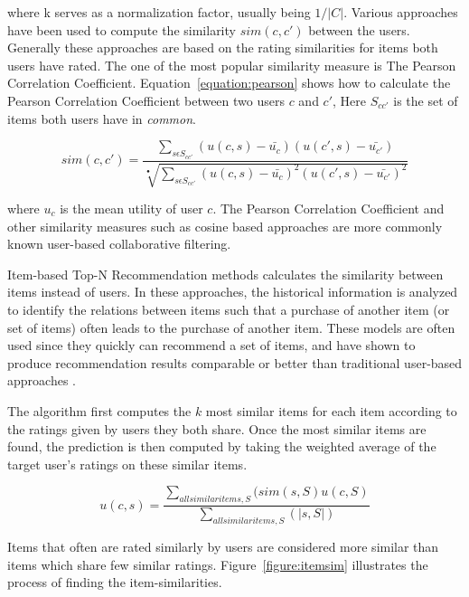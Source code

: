 where k serves as a normalization factor, usually being $1/|C|$. Various
approaches have been used to compute the similarity $sim(c, c')$ between the
users. Generally these approaches are based on the rating similarities for
items both users have rated. The one of the most popular similarity measure is The Pearson
Correlation Coefficient. Equation~\ref{equation:pearson} shows how to calculate
the Pearson Correlation Coefficient between two users $c$ and $c'$, Here
$S_{cc'}$ is the set of items both users have in \emph{common}.

\begin{equation}
sim(c, c') = \frac{\sum_{s \epsilon S_{cc'}} (u(c, s)-\bar{u_{c}})(u(c',s)-\bar{u_{c'}})}{\sqrt[•]{\sum_{s \epsilon S_{cc'}} (u(c, s)-\bar{u_{c}})^{2}(u(c',s)-\bar{u_{c'}})^{2}}}
\label{equation:pearson}
\end{equation}

where $u_{c}$ is the mean utility of user $c$. The Pearson Correlation
Coefficient and other similarity measures such as cosine based approaches are
more commonly known user-based collaborative filtering.

Item-based Top-N Recommendation methods calculates the similarity between items
instead of users. In these approaches, the historical information is analyzed
to identify the relations between items such that a purchase of another item
(or set of items) often leads to the purchase of another item. These models are
often used since they quickly can recommend a set of items, and have shown to
produce recommendation results comparable or better than traditional user-based
approaches \cite{Karypis2001}.

The algorithm first computes the $k$ most similar items for each item according
to the ratings given by users they both share. Once the most similar items are
found, the prediction is then computed by taking the weighted average of the
target user's ratings on these similar items.

\begin{equation}
u(c,s) = \frac{\sum_{all similar items, S} (sim(s,S)u(c, S)}{\sum_{all similar items, S}(|s,S|)}
\end{equation}

Items that often are rated similarly by users are considered more similar than
items which share few similar ratings. Figure~\ref{figure:itemsim} illustrates
the process of finding the item-similarities.

